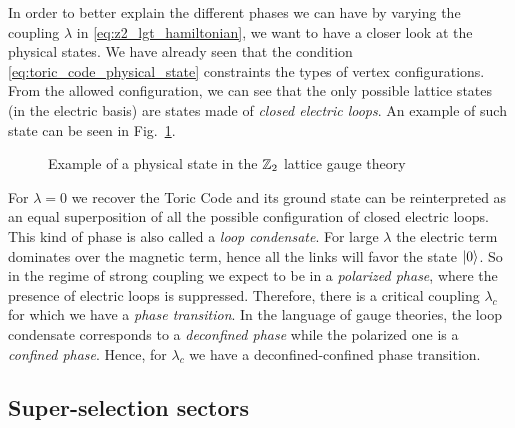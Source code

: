 In order to better explain the different phases we can have by varying the coupling $\lambda$ in \eqref{eq:z2_lgt_hamiltonian}, we want to have a closer look at the physical states.
We have already seen that the condition \eqref{eq:toric_code_physical_state} constraints the types of vertex configurations.
From the allowed configuration, we can see that the only possible lattice states (in the electric basis) are states made of \emph{closed electric loops}.
An example of such state can be seen in Fig.~\ref{fig:physical_state_z2}.


\begin{figure}[t]
    \centering
    
    \caption{Example of a physical state in the $\mathbb{Z}_2$ lattice gauge theory}
    \label{fig:physical_state_z2}
\end{figure}


For $\lambda = 0$ we recover the Toric Code and its ground state can be reinterpreted as an equal superposition of all the possible configuration of closed electric loops.
This kind of phase is also called a \emph{loop condensate}.
For large $\lambda$ the electric term dominates over the magnetic term, hence all the links will favor the state $\ket{0}$.
So in the regime of strong coupling we expect to be in a \emph{polarized phase}, where the presence of electric loops is suppressed.
Therefore, there is a critical coupling $\lambda_c$ for which we have a \emph{phase transition}.
In the language of gauge theories, the loop condensate corresponds to a \emph{deconfined phase} while the polarized one is a \emph{confined phase}.
Hence, for $\lambda_c$ we have a deconfined-confined phase transition.


\subsection{Super-selection sectors}
\label{sub:super_selection_sectors}


